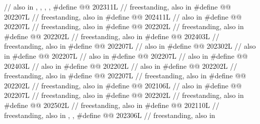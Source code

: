 \begin{codeblock}
  // also in , , , , 
#define @@                   202311L // freestanding, also in 
#define @@                  202207L // freestanding, also in 
#define @@               202411L // also in 
#define @@          202207L // freestanding, also in 
#define @@                      202202L // freestanding, also in 
#define @@                   202202L // freestanding, also in 
#define @@                     202403L // freestanding, also in 
#define @@                   202207L // also in 
#define @@                  202302L // also in 
#define @@                  202207L // also in 
#define @@                       202207L // also in 
#define @@            202403L // also in 
#define @@                       202202L // also in 
#define @@                  202202L // freestanding, also in 
#define @@                     202207L // freestanding, also in 
#define @@                      202202L // freestanding, also in 
#define @@           202106L // also in 
#define @@                     202207L // freestanding, also in 
#define @@               202202L // freestanding, also in 
#define @@                   202502L // freestanding, also in 
#define @@                        202110L
  // freestanding, also in , , 
#define @@                             202306L // freestanding, also in 

\end{codeblock}
